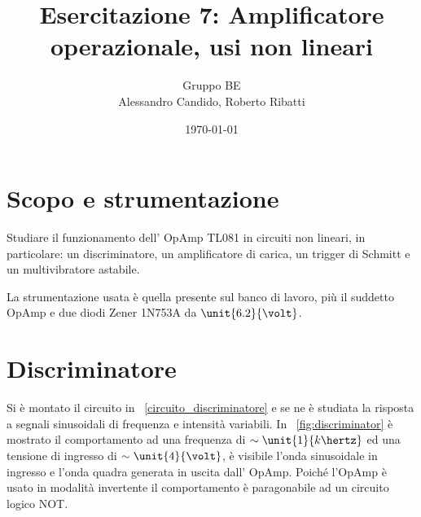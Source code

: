 \documentclass[10pt,a4paper]{article}
\title{Esercitazione 7: Amplificatore operazionale, usi non lineari}
\author{Gruppo BE \\ Alessandro Candido, Roberto Ribatti}
\date{\today}
\begin{document}
\maketitle

\section{Scopo e strumentazione}

Studiare il funzionamento dell’ OpAmp TL081 in circuiti non lineari, in particolare: un discriminatore, un amplificatore di carica, un trigger di Schmitt e un multivibratore astabile.

La strumentazione usata è quella presente sul banco di lavoro, più il suddetto OpAmp e due diodi Zener 1N753A da $\unit{6.2}{\volt}$.

\section{Discriminatore}
Si è montato il circuito in \figurename{~\ref{circuito_discriminatore}} e se ne è studiata la risposta a segnali sinusoidali di frequenza e intensità variabili. In \figurename{~\ref{fig:discriminator}} è mostrato il comportamento ad una frequenza di $\sim \unit{1}{k\hertz}$ ed una tensione di ingresso di $\sim\unit{4}{\volt}$, è visibile l'onda sinusoidale in ingresso e l'onda quadra generata in uscita dall' OpAmp. Poiché l'OpAmp è usato in modalità invertente il comportamento è paragonabile ad un circuito logico NOT.
\end{document}

